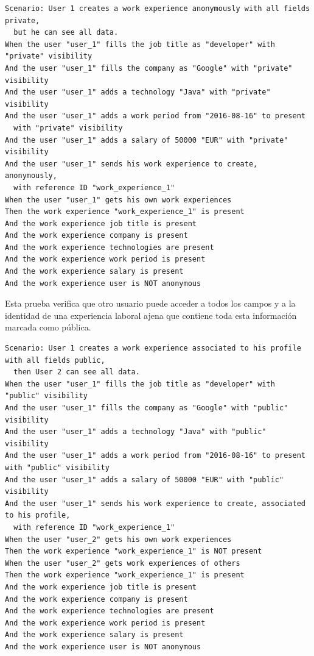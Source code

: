 \documentclass[a4paper, 12pt]{book}
\begin{document}
        {\scriptsize
    \linespread{1}
    \begin{verbatim}
Scenario: User 1 creates a work experience anonymously with all fields private,
  but he can see all data.
When the user "user_1" fills the job title as "developer" with "private" visibility
And the user "user_1" fills the company as "Google" with "private" visibility
And the user "user_1" adds a technology "Java" with "private" visibility
And the user "user_1" adds a work period from "2016-08-16" to present
  with "private" visibility
And the user "user_1" adds a salary of 50000 "EUR" with "private" visibility
And the user "user_1" sends his work experience to create, anonymously,
  with reference ID "work_experience_1"
When the user "user_1" gets his own work experiences
Then the work experience "work_experience_1" is present
And the work experience job title is present
And the work experience company is present
And the work experience technologies are present
And the work experience work period is present
And the work experience salary is present
And the work experience user is NOT anonymous
    \end{verbatim}
    }
    Esta prueba verifica que otro usuario puede acceder a todos los campos y a la identidad de una experiencia
    laboral ajena que contiene toda esta información marcada como pública.
        {\scriptsize
    \linespread{1}
    \begin{verbatim}
Scenario: User 1 creates a work experience associated to his profile with all fields public,
  then User 2 can see all data.
When the user "user_1" fills the job title as "developer" with "public" visibility
And the user "user_1" fills the company as "Google" with "public" visibility
And the user "user_1" adds a technology "Java" with "public" visibility
And the user "user_1" adds a work period from "2016-08-16" to present with "public" visibility
And the user "user_1" adds a salary of 50000 "EUR" with "public" visibility
And the user "user_1" sends his work experience to create, associated to his profile,
  with reference ID "work_experience_1"
When the user "user_2" gets his own work experiences
Then the work experience "work_experience_1" is NOT present
When the user "user_2" gets work experiences of others
Then the work experience "work_experience_1" is present
And the work experience job title is present
And the work experience company is present
And the work experience technologies are present
And the work experience work period is present
And the work experience salary is present
And the work experience user is NOT anonymous
    \end{verbatim}
    }
\end{document}
